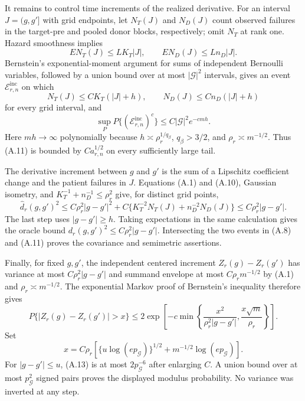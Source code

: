 It remains to control time increments of the realized derivative. For an interval \(J=(g,g']\) with grid endpoints, let \(N_T(J)\) and \(N_D(J)\) count observed failures in the target-pre and pooled donor blocks, respectively; omit \(N_T\) at rank one. Hazard smoothness implies
\[
 EN_T(J)\le LK_T|J|,
 \qquad EN_D(J)\le Ln_D|J|.                               \tag{A.9}
\]
Bernstein's exponential-moment argument for sums of independent Bernoulli variables, followed by a union bound over at most \(|\mathcal G|^2\) intervals, gives an event \(\mathcal E_{r,n}^{\mathrm{inc}}\) on which
\[
 N_T(J)\le C K_T(|J|+h),
 \qquad N_D(J)\le C n_D(|J|+h)                            \tag{A.10}
\]
for every grid interval, and
\[
 \sup_PP\{(\mathcal E_{r,n}^{\mathrm{inc}})^c\}
 \le C|\mathcal G|^2e^{-cmh}.                             \tag{A.11}
\]
Here \(mh\to\infty\) polynomially because \(h\asymp\rho_r^{1/q_\beta}\), \(q_\beta>3/2\), and \(\rho_r\asymp m^{-1/2}\). Thus (A.11) is bounded by \(Ca_{r,n}^{1/2}\) on every sufficiently large tail.

The derivative increment between \(g\) and \(g'\) is the sum of a Lipschitz coefficient change and the patient failures in \(J\). Equations (A.1) and (A.10), Gaussian isometry, and \(K_T^{-1}+n_D^{-1}\le\rho_r^2\) give, for distinct grid points,
\[
 \widehat d_r(g,g')^2
 \le C\rho_r^2|g-g'|^2
 +C\{K_T^{-2}N_T(J)+n_D^{-2}N_D(J)\}
 \le C\rho_r^2|g-g'|.                                    \tag{A.12}
\]
The last step uses \(|g-g'|\ge h\). Taking expectations in the same calculation gives the oracle bound \(d_r(g,g')^2\le C\rho_r^2|g-g'|\). Intersecting the two events in (A.8) and (A.11) proves the covariance and semimetric assertions.

Finally, for fixed \(g,g'\), the independent centered increment \(Z_r(g)-Z_r(g')\) has variance at most \(C\rho_r^2|g-g'|\) and summand envelope at most \(C\rho_r m^{-1/2}\) by (A.1) and \(\rho_r\asymp m^{-1/2}\). The exponential Markov proof of Bernstein's inequality therefore gives
\[
 P\{|Z_r(g)-Z_r(g')|>x\}
 \le2\exp\left[-c\min\left\{
 \frac{x^2}{\rho_r^2|g-g'|},
 \frac{x\sqrt m}{\rho_r}\right\}\right].               \tag{A.13}
\]
Set
\[
 x=C\rho_r\left[\{u\log(e p_{\mathcal G})\}^{1/2}
 +m^{-1/2}\log(e p_{\mathcal G})\right].
\]
For \(|g-g'|\le u\), (A.13) is at most \(2p_{\mathcal G}^{-6}\) after enlarging \(C\). A union bound over at most \(p_{\mathcal G}^2\) signed pairs proves the displayed modulus probability. No variance was inverted at any step.

